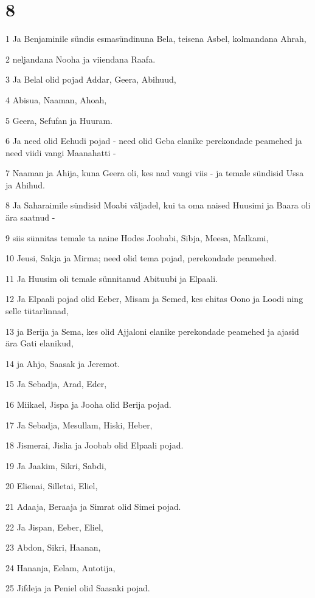 \chapter{8}

\par 1 Ja Benjaminile sündis esmasündinuna Bela, teisena Asbel, kolmandana Ahrah,
\par 2 neljandana Nooha ja viiendana Raafa.
\par 3 Ja Belal olid pojad Addar, Geera, Abihuud,
\par 4 Abisua, Naaman, Ahoah,
\par 5 Geera, Sefufan ja Huuram.
\par 6 Ja need olid Eehudi pojad - need olid Geba elanike perekondade peamehed ja need viidi vangi Maanahatti -
\par 7 Naaman ja Ahija, kuna Geera oli, kes nad vangi viis - ja temale sündisid Ussa ja Ahihud.
\par 8 Ja Saharaimile sündisid Moabi väljadel, kui ta oma naised Huusimi ja Baara oli ära saatnud -
\par 9 siis sünnitas temale ta naine Hodes Joobabi, Sibja, Meesa, Malkami,
\par 10 Jeusi, Sakja ja Mirma; need olid tema pojad, perekondade peamehed.
\par 11 Ja Huusim oli temale sünnitanud Abituubi ja Elpaali.
\par 12 Ja Elpaali pojad olid Eeber, Misam ja Semed, kes ehitas Oono ja Loodi ning selle tütarlinnad,
\par 13 ja Berija ja Sema, kes olid Ajjaloni elanike perekondade peamehed ja ajasid ära Gati elanikud,
\par 14 ja Ahjo, Saasak ja Jeremot.
\par 15 Ja Sebadja, Arad, Eder,
\par 16 Miikael, Jispa ja Jooha olid Berija pojad.
\par 17 Ja Sebadja, Mesullam, Hiski, Heber,
\par 18 Jismerai, Jislia ja Joobab olid Elpaali pojad.
\par 19 Ja Jaakim, Sikri, Sabdi,
\par 20 Elienai, Silletai, Eliel,
\par 21 Adaaja, Beraaja ja Simrat olid Simei pojad.
\par 22 Ja Jispan, Eeber, Eliel,
\par 23 Abdon, Sikri, Haanan,
\par 24 Hananja, Eelam, Antotija,
\par 25 Jifdeja ja Peniel olid Saasaki pojad.
